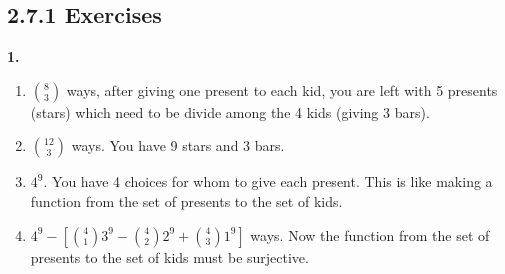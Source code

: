 \documentclass[10pt,]{book}
\theoremstyle{plain}
\theoremstyle{definition}
\theoremstyle{definition}
\theoremstyle{definition}
\numberwithin{equation}{chapter}
\begin{document}
\subsection*{2.7.1 Exercises}
\noindent\textbf{1.}\quad{}
            \leavevmode%
\begin{enumerate}[label=(\alph*)]
\item\hypertarget{li-663}{}\({8 \choose 3}\) ways, after giving one present to each kid, you are left with 5 presents (stars) which need to be divide among the 4 kids (giving 3 bars).%
\item\hypertarget{li-664}{}\({12 \choose 3}\) ways. You have 9 stars and 3 bars.%
\item\hypertarget{li-665}{}\(4^9\). You have 4 choices for whom to give each present. This is like making a function from the set of presents to the set of kids.%
\item\hypertarget{li-666}{}\(4^9 - \left[{4 \choose 1}3^9 - {4\choose 2}2^9 + {4 \choose 3}1^9 \right]\) ways. Now the function from the set of presents to the set of kids must be surjective.%
\end{enumerate}
\end{document}
